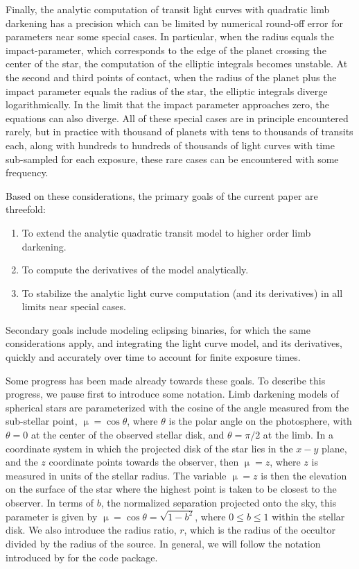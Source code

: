\documentclass[modern]{aastex61}
\begin{document}
Finally, the analytic computation of transit light curves with quadratic
limb darkening has a precision which can be limited by numerical round-off
error for parameters near some special cases.  In
particular, when the radius equals the impact-parameter, which corresponds to
the edge of the planet crossing the center of the star, the computation of the
elliptic integrals becomes unstable.  At the second and third points of
contact, when the radius of the planet plus the impact parameter equals
the radius of the star, the elliptic integrals diverge logarithmically.  In the
limit that the impact parameter approaches zero, the equations can also
diverge.  All of these special cases are in principle encountered rarely,
but in practice with thousand of planets with tens to thousands of
transits each, along with hundreds to hundreds of thousands of light
curves with time sub-sampled for each exposure, these rare cases can
be encountered with some frequency.

Based on these considerations, the primary goals of the current paper are
threefold:
\begin{enumerate}
\item To extend the analytic quadratic transit model to higher order limb darkening.
\item To compute the derivatives of the model analytically.
\item To stabilize the analytic light curve computation (and its derivatives)
in all limits near special cases.
\end{enumerate}
Secondary goals include modeling eclipsing binaries, for which the same
considerations apply, and integrating the light curve model, and its
derivatives, quickly and accurately over time to account for finite
exposure times.

Some progress has been made already towards these goals.  To describe this
progress, we pause first to introduce some notation.  Limb darkening models
of spherical stars are parameterized with the cosine of the angle measured
from the sub-stellar point, $\upmu = \cos{\theta}$, where $\theta$ is the
polar angle on the photosphere, with $\theta=0$ at the center of the observed
stellar disk, and $\theta=\pi/2$ at the limb.  In a coordinate system in which
the projected disk of the star lies in the $x-y$ plane, and the $z$ coordinate
points towards the observer, then $\upmu = z$, where $z$ is measured in units
of the stellar radius.  The variable $\upmu=z$ is then the elevation on the
surface of the star where the highest point is taken to be closest to the observer.
In terms of $b$, the normalized separation projected onto
the sky, this parameter is given by $\upmu = \cos{\theta} =\sqrt{1-b^2}$, where
$0\le b \le 1$ within the stellar disk.  We also introduce the radius ratio,
$r$, which is the radius of the occultor divided by the radius of the source.
In general, we will follow the notation
introduced by \citet{starry} for the \starry code package.
\end{document}
